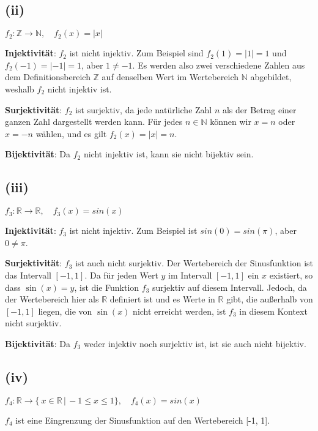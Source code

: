 \documentclass[12pt]{article}
\begin{document}
\subsection*{(ii)} \( f_2: \mathbb{Z} \rightarrow \mathbb{N}, \quad f_2(x) = |x| \)

\textbf{Injektivität}: \( f_2 \) ist nicht injektiv. Zum Beispiel sind \( f_2(1) = |1| = 1 \) und \( f_2(-1) = |-1| = 1 \), aber \( 1 \neq -1 \). Es werden also zwei verschiedene Zahlen aus dem Definitionsbereich \(\mathbb{Z}\) auf denselben Wert im Wertebereich \(\mathbb{N}\) abgebildet, weshalb \( f_2 \) nicht injektiv ist.

\textbf{Surjektivität}: \( f_2 \) ist surjektiv, da jede natürliche Zahl \( n \) als der Betrag einer ganzen Zahl dargestellt werden kann. Für jedes \( n \in \mathbb{N} \) 
können wir \( x = n \) oder \( x = -n \) wählen, und es gilt \( f_2(x) = |x| = n \).

\textbf{Bijektivität}: Da \( f_2 \) nicht injektiv ist, kann sie nicht bijektiv sein.

\subsection*{(iii)} \( f_3: \mathbb{R} \rightarrow \mathbb{R}, \quad f_3(x) = sin(x) \)

\textbf{Injektivität}: \( f_3 \) ist nicht injektiv. Zum Beispiel ist \( sin(0) = sin(\pi)\), aber \( 0 \neq \pi \).

\textbf{Surjektivität}: \( f_3 \) ist auch nicht surjektiv. Der Wertebereich der Sinusfunktion ist das Intervall \( [-1, 1] \). Da für jeden Wert \( y \) im Intervall \( [-1, 1] \) ein \( x \) existiert, so dass \( \sin(x) = y \), ist die Funktion \( f_3 \) surjektiv auf diesem Intervall. Jedoch, da der Wertebereich hier als \( \mathbb{R} \) definiert ist und es Werte in \( \mathbb{R} \) gibt, die außerhalb von \( [-1, 1] \) liegen, die von \( \sin(x) \) nicht erreicht werden, ist \( f_3 \) in diesem Kontext nicht surjektiv.

\textbf{Bijektivität}: Da \( f_3 \) weder injektiv noch surjektiv ist, ist sie auch nicht bijektiv.

\subsection*{(iv)} \( f_4: \mathbb{R} \rightarrow \{\ x \in \mathbb{R} \, | \, -1 \leq x \leq 1 \}, \quad f_4(x) = sin(x) \)

\( f_4 \) ist eine Eingrenzung der Sinusfunktion auf den Wertebereich [-1, 1].
\end{document}

